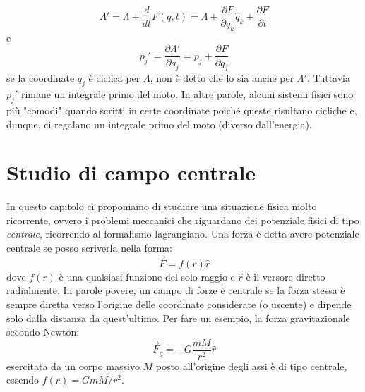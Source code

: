 \documentclass[a4paper,openany]{article}
\begin{document}
	$$
	\Lambda' = \Lambda + \dfrac{d}{dt}F(q,t) = \Lambda + \dfrac{\partial F}{\partial q_{k}}\dot{q}_{k} + \dfrac{\partial F}{\partial t}
	$$
	e
	$$
	p_{j}' = \dfrac{\partial \Lambda'}{\partial q_{j}} = p_{j} + \dfrac{\partial F}{\partial q_{j}}
	$$
	se la coordinate $q_{j}$ è ciclica per $\Lambda$, non è detto che lo sia anche per $\Lambda'$. Tuttavia $p_{j}'$ rimane un integrale primo del moto. In altre parole, alcuni sistemi fisici sono più "comodi" quando scritti in certe coordinate poiché queste risultano cicliche e, dunque, ci regalano un integrale primo del moto (diverso dall'energia).
	\newpage
	\section{Studio di campo centrale}
	In questo capitolo ci proponiamo di studiare una situazione fisica molto ricorrente, ovvero i problemi meccanici che riguardano dei potenziale fisici di tipo \textit{centrale}, ricorrendo al formalismo lagrangiano.
	Una forza è detta avere potenziale centrale se posso scriverla nella forma:
	\begin{equation}
		\vec{F} = f(r)\hat{r}
	\end{equation}
	dove $f(r)$ è una qualsiasi funzione del solo raggio e $\hat{r}$ è il versore diretto radialmente. In parole povere, un campo di forze è centrale se la forza stessa è sempre diretta verso l'origine delle coordinate considerate (o uscente) e dipende solo dalla distanza da quest'ultimo. Per fare un esempio, la forza gravitazionale secondo Newton:
	$$
	\vec{F}_{g} = -G\dfrac{mM}{r^{2}}\hat{r}
	$$
	esercitata da un corpo massivo $M$ posto all'origine degli assi è di tipo centrale, essendo $f(r) =GmM/r^{2}$.
	
\end{document}
